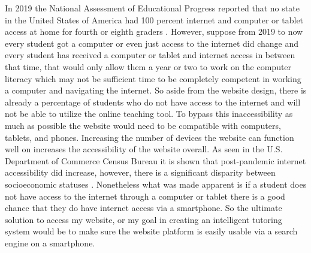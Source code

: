 \documentclass[10pt,twocolumn]{article}
\begin{document}
In 2019 the National Assessment of Educational Progress reported that no state in the United States of America had 100 percent internet and computer or tablet access at home for fourth or eighth graders \cite{hemphill_nces_nodate}. However, suppose from 2019 to now every student got a computer or even just access to the internet did change and every student has received a computer or tablet and internet access in between that time, that would only allow them a year or two to work on the computer literacy which may not be sufficient time to be completely competent in working a computer and navigating the internet. So aside from the website design, there is already a percentage of students who do not have access to the internet and will not be able to utilize the online teaching tool. To bypass this inaccessibility as much as possible the website would need to be compatible with computers, tablets, and phones. Increasing the number of devices the website can function well on increases the accessibility of the website overall. As seen in the U.S. Department of Commerce Census Bureau it is shown that post-pandemic internet accessibility did increase, however, there is a significant disparity between socioeconomic statuses  \cite{irwin_nces_nodate}. Nonetheless what was made apparent is if a student does not have access to the internet through a computer or tablet there is a good chance that they do have internet access via a smartphone. So the ultimate solution to access my website, or my goal in creating an intelligent tutoring system would be to make sure the website platform is easily usable via a search engine on a smartphone.
\end{document}
